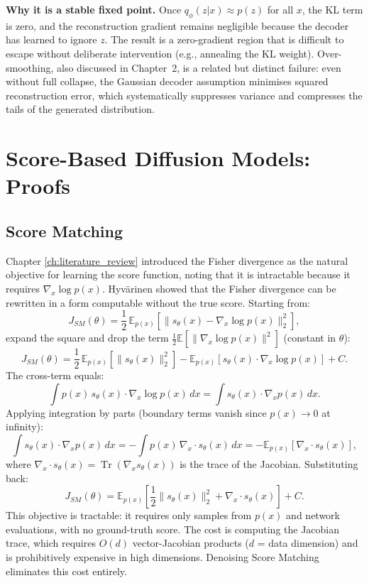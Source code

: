 \textbf{Why it is a stable fixed point.} Once $q_\phi(z|x) \approx p(z)$
for all $x$, the KL term is zero, and the reconstruction gradient remains
negligible because the decoder has learned to ignore $z$. The result is a
zero-gradient region that is difficult to escape without deliberate intervention
(e.g., annealing the KL weight). Over-smoothing, also discussed in
Chapter~2, is a related but distinct failure: even without full collapse, the
Gaussian decoder assumption minimises squared reconstruction error, which
systematically suppresses variance and compresses the tails of the generated
distribution.

\section{Score-Based Diffusion Models: Proofs}
\label{app:sec:score_proofs}

\subsection{Score Matching}
\label{app:subsec:sm}

Chapter \ref{ch:literature_review}  introduced the Fisher divergence as the natural objective for
learning the score function, noting that it is intractable because it requires
$\nabla_x \log p(x)$. Hyv\"arinen \cite{hyvarinen2005estimation} showed that
the Fisher divergence can be rewritten in a form computable without the true
score. Starting from:
\[
    J_{SM}(\theta) = \frac{1}{2}\,
    \mathbb{E}_{p(x)}\!\left[\|s_\theta(x) - \nabla_x \log p(x)\|_2^2\right],
\]
expand the square and drop the term $\frac{1}{2}\mathbb{E}[\|\nabla_x \log
p(x)\|^2]$ (constant in $\theta$):
\[
    J_{SM}(\theta) = \frac{1}{2}\,\mathbb{E}_{p(x)}\!\left[\|s_\theta(x)\|_2^2\right]
    - \mathbb{E}_{p(x)}\!\left[s_\theta(x) \cdot \nabla_x \log p(x)\right] + C.
\]
The cross-term equals:
\[
    \int p(x)\, s_\theta(x) \cdot \nabla_x \log p(x)\,dx
    = \int s_\theta(x) \cdot \nabla_x p(x)\,dx.
\]
Applying integration by parts (boundary terms vanish since $p(x)\to 0$ at
infinity):
\[
    \int s_\theta(x) \cdot \nabla_x p(x)\,dx
    = -\int p(x)\,\nabla_x \cdot s_\theta(x)\,dx
    = -\mathbb{E}_{p(x)}\!\left[\nabla_x \cdot s_\theta(x)\right],
\]
where $\nabla_x \cdot s_\theta(x) = \operatorname{Tr}(\nabla_x s_\theta(x))$
is the trace of the Jacobian. Substituting back:
\begin{equation}
    \label{eq:sm_tractable}
    J_{SM}(\theta) = \mathbb{E}_{p(x)}\!\left[
    \frac{1}{2}\|s_\theta(x)\|_2^2 + \nabla_x \cdot s_\theta(x)
    \right] + C.
\end{equation}
This objective is tractable: it requires only samples from $p(x)$ and network
evaluations, with no ground-truth score. The cost is computing the Jacobian
trace, which requires $O(d)$ vector-Jacobian products ($d$ = data dimension)
and is prohibitively expensive in high dimensions. Denoising Score Matching
eliminates this cost entirely.

